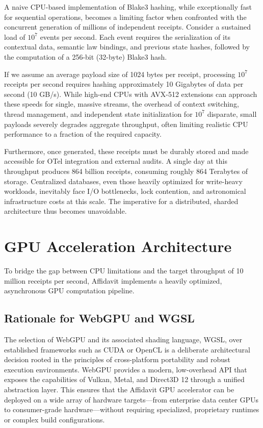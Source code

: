 A naive CPU-based implementation of Blake3 hashing, while exceptionally fast for sequential operations, becomes a limiting factor when confronted with the concurrent generation of millions of independent receipts. Consider a sustained load of $10^7$ events per second. Each event requires the serialization of its contextual data, semantic law bindings, and previous state hashes, followed by the computation of a 256-bit (32-byte) Blake3 hash. 

If we assume an average payload size of 1024 bytes per receipt, processing $10^7$ receipts per second requires hashing approximately 10 Gigabytes of data per second (10 GB/s). While high-end CPUs with AVX-512 extensions can approach these speeds for single, massive streams, the overhead of context switching, thread management, and independent state initialization for $10^7$ disparate, small payloads severely degrades aggregate throughput, often limiting realistic CPU performance to a fraction of the required capacity. 

Furthermore, once generated, these receipts must be durably stored and made accessible for OTel integration and external audits. A single day at this throughput produces 864 billion receipts, consuming roughly 864 Terabytes of storage. Centralized databases, even those heavily optimized for write-heavy workloads, inevitably face I/O bottlenecks, lock contention, and astronomical infrastructure costs at this scale. The imperative for a distributed, sharded architecture thus becomes unavoidable.

\section{GPU Acceleration Architecture}

To bridge the gap between CPU limitations and the target throughput of 10 million receipts per second, Affidavit implements a heavily optimized, asynchronous GPU computation pipeline.

\subsection{Rationale for WebGPU and WGSL}

The selection of WebGPU and its associated shading language, WGSL, over established frameworks such as CUDA or OpenCL is a deliberate architectural decision rooted in the principles of cross-platform portability and robust execution environments. WebGPU provides a modern, low-overhead API that exposes the capabilities of Vulkan, Metal, and Direct3D 12 through a unified abstraction layer. This ensures that the Affidavit GPU accelerator can be deployed on a wide array of hardware targets—from enterprise data center GPUs to consumer-grade hardware—without requiring specialized, proprietary runtimes or complex build configurations.

